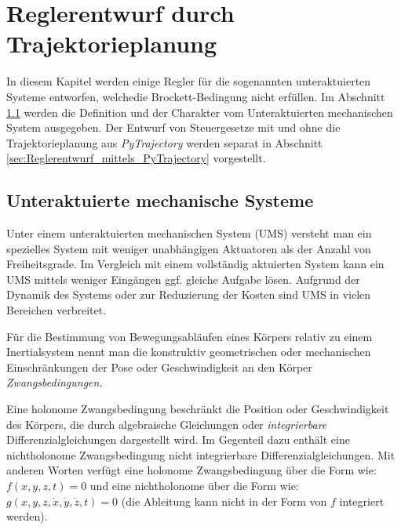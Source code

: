 \ifpdf
\graphicspath{{bild/}}
\else
\graphicspath{%
	{bild/}}
\fi
\chapter{Reglerentwurf durch Trajektorieplanung}
\label{ch:Reglerentwurf-durch-Trajektorieplanung}
In diesem Kapitel werden einige Regler für die sogenannten unteraktuierten Systeme entworfen, welchedie Brockett-Bedingung nicht erfüllen. Im Abschnitt \ref{sec:Unteraktuiertes_mechanisches_System} werden die Definition und der Charakter vom Unteraktuierten mechanischen System ausgegeben. Der Entwurf von Steuergesetze mit und ohne die Trajektorieplanung aus \emph{PyTrajectory} werden separat in Abschnitt \ref{sec:Reglerentwurf_mittels_PyTrajectory} vorgestellt.

\section{Unteraktuierte mechanische Systeme}
\label{sec:Unteraktuiertes_mechanisches_System}
Unter einem unteraktuierten mechanischen System (UMS) versteht man ein spezielles System mit weniger unabhängigen Aktuatoren als der Anzahl von Freiheitsgrade. Im Vergleich mit einem vollständig aktuierten System kann ein UMS mittels weniger Eingängen ggf. gleiche Aufgabe lösen. Aufgrund der Dynamik des Systems oder zur Reduzierung der Kosten sind UMS in vielen Bereichen verbreitet.

Für die Bestimmung von Bewegungsabläufen eines Körpers relativ zu einem Inertialsystem nennt man die konstruktiv geometrischen oder mechanischen Einschränkungen der Pose oder Geschwindigkeit an den Körper \emph{Zwangsbedingungen}.

Eine holonome Zwangsbedingung beschränkt die Position oder Geschwindigkeit des Körpers, die durch algebraische Gleichungen oder \emph{integrierbare} Differenzialgleichungen dargestellt wird. Im Gegenteil dazu enthält eine nichtholonome Zwangsbedingung nicht integrierbare Differenzialgleichungen. Mit anderen Worten verfügt eine holonome Zwangsbedingung über die Form wie: $f(x,y,z,t)=0$ und eine nichtholonome über die Form wie: $g(x,y,z,\dot{x},\dot{y},\dot{z},t)=0$ (die Ableitung kann nicht in der Form von $f$ integriert werden).

